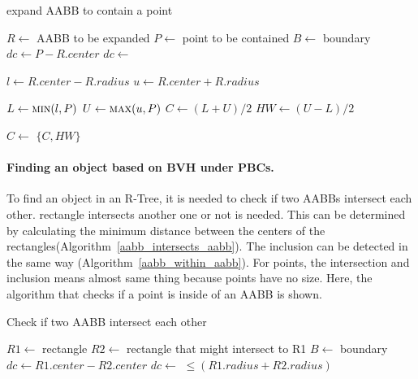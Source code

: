 \documentclass[10pt,letterpaper,twocolumn]{article}
\begin{document}
\begin{algorithm}[tb]
    \caption{expand AABB to contain a point}
    \label{expand_aabb_point}
    \begin{algorithmic}
        \State $R \gets$ AABB to be expanded
        \State $P \gets$ point to be contained
        \State $B \gets$ boundary
            \State $dc \gets P - R.center$
            \State $dc \gets$ 

            \State $l \gets R.center - R.radius$
            \State $u \gets R.center + R.radius$

            \State $L  \gets \Call{min}{l, P}$
            \State $U  \gets \Call{max}{u, P}$
            \State $C  \gets (L + U) / 2$
            \State $HW \gets (U - L) / 2$

            \State $C \gets$ 
            \State \Return $\{C, HW\}$
        \EndFunction
     \end{algorithmic}
\end{algorithm}

\paragraph{Finding an object based on BVH under PBCs.}

To find an object in an R-Tree, it is needed to check if two AABBs intersect
each other.
rectangle intersects another one or not is needed.
This can be determined by calculating the minimum distance between the centers of
the rectangles(Algorithm~\ref{aabb_intersects_aabb}).
The inclusion can be detected in the same way (Algorithm~\ref{aabb_within_aabb}).
For points, the intersection and inclusion means almost same thing because points
have no size. Here, the algorithm that checks if a point is inside of an AABB
is shown.

\begin{algorithm}[tb]
    \caption{Check if two AABB intersect each other}
    \label{aabb_intersects_aabb}
    \begin{algorithmic}
        \State $R1 \gets$ rectangle
        \State $R2 \gets$ rectangle that might intersect to R1
        \State $B  \gets$ boundary
            \State $dc \gets R1.center - R2.center$
            \State $dc \gets$ 
            \State \Return {} $\leq (R1.radius + R2.radius)$
        \EndFunction
     \end{algorithmic}
\end{algorithm}
\end{document}
